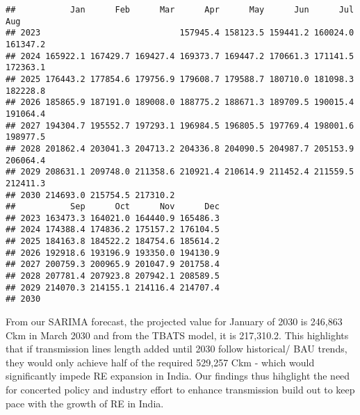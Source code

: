 \documentclass[
]{article}
\begin{document}
\begin{verbatim}
##           Jan      Feb      Mar      Apr      May      Jun      Jul      Aug
## 2023                            157945.4 158123.5 159441.2 160024.0 161347.2
## 2024 165922.1 167429.7 169427.4 169373.7 169447.2 170661.3 171141.5 172363.1
## 2025 176443.2 177854.6 179756.9 179608.7 179588.7 180710.0 181098.3 182228.8
## 2026 185865.9 187191.0 189008.0 188775.2 188671.3 189709.5 190015.4 191064.4
## 2027 194304.7 195552.7 197293.1 196984.5 196805.5 197769.4 198001.6 198977.5
## 2028 201862.4 203041.3 204713.2 204336.8 204090.5 204987.7 205153.9 206064.4
## 2029 208631.1 209748.0 211358.6 210921.4 210614.9 211452.4 211559.5 212411.3
## 2030 214693.0 215754.5 217310.2                                             
##           Sep      Oct      Nov      Dec
## 2023 163473.3 164021.0 164440.9 165486.3
## 2024 174388.4 174836.2 175157.2 176104.5
## 2025 184163.8 184522.2 184754.6 185614.2
## 2026 192918.6 193196.9 193350.0 194130.9
## 2027 200759.3 200965.9 201047.9 201758.4
## 2028 207781.4 207923.8 207942.1 208589.5
## 2029 214070.3 214155.1 214116.4 214707.4
## 2030
\end{verbatim}

From our SARIMA forecast, the projected value for January of 2030 is
246,863 Ckm in March 2030 and from the TBATS model, it is 217,310.2.
This highlights that if transmission lines length added until 2030
follow historical/ BAU trends, they would only achieve half of the
required 529,257 Ckm - which would significantly impede RE expansion in
India. Our findings thus hihglight the need for concerted policy and
industry effort to enhance transmission build out to keep pace with the
growth of RE in India.
\end{document}
